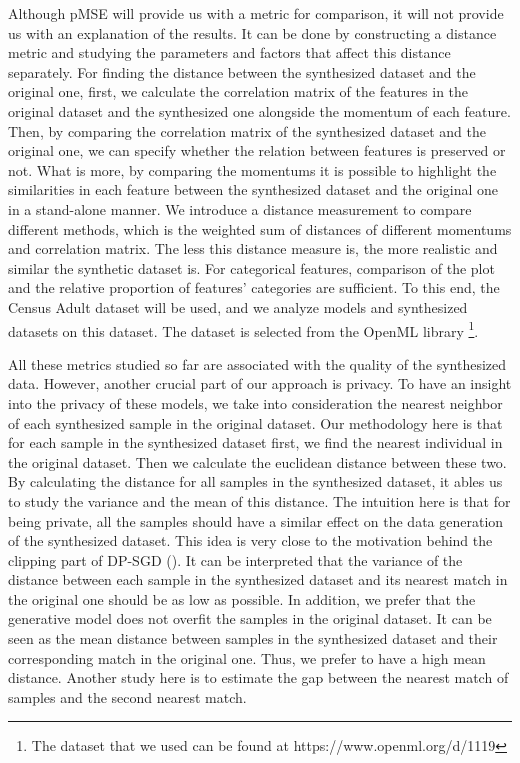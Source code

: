 \documentclass{article}
\begin{document}
Although pMSE will provide us with a metric for comparison, it will not provide us with an explanation of the results. It can be done by constructing a distance metric and studying the parameters and factors that affect this distance separately. For finding the distance between the synthesized dataset and the original one, first, we calculate the correlation matrix of the features in the original dataset and the synthesized one alongside the momentum of each feature. Then, by comparing the correlation matrix of the synthesized dataset and the original one, we can specify whether the relation between features is preserved or not. What is more, by comparing the momentums it is possible to highlight the similarities in each feature between the synthesized dataset and the original one in a stand-alone manner.  We introduce a distance measurement to compare different methods, which is the weighted sum of distances of different momentums and correlation matrix. The less this distance measure is, the more realistic and similar the synthetic dataset is. For categorical features, comparison of the plot and the relative proportion of features' categories are sufficient. To this end, the Census Adult dataset will be used, and we analyze models and synthesized datasets on this dataset. The dataset is selected from the OpenML library \footnote{The dataset that we used can be found at https://www.openml.org/d/1119}.

All these metrics studied so far are associated with the quality of the synthesized data. However, another crucial part of our approach is privacy. To have an insight into the privacy of these models, we take into consideration the nearest neighbor of each synthesized sample in the original dataset. Our methodology here is that for each sample in the synthesized dataset first, we find the nearest individual in the original dataset. Then we calculate the euclidean distance between these two. By calculating the distance for all samples in the synthesized dataset, it ables us to study the variance and the mean of this distance. The intuition here is that for being private, all the samples should have a similar effect on the data generation of the synthesized dataset. This idea is very close to the motivation behind the clipping part of DP-SGD (\cite{abadi2016deep}). It can be interpreted that the variance of the distance between each sample in the synthesized dataset and its nearest match in the original one should be as low as possible. In addition, we prefer that the generative model does not overfit the samples in the original dataset. It can be seen as the mean distance between samples in the synthesized dataset and their corresponding match in the original one. Thus, we prefer to have a high mean distance. Another study here is to estimate the gap between the nearest match of samples and the second nearest match.
\end{document}
